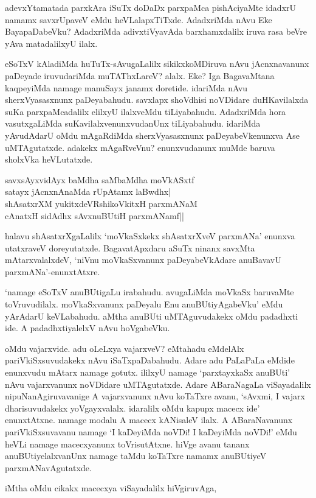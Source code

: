 adevxYtamatada parxkAra iSuTx doDaDx parxpaMca pishAciyaMte idadxrU namamx savxrUpaveV eMdu heVLalapxTiTxde. AdadxriMda nAvu Eke BayapaDabeVku? AdadxriMda adivxtiVyavAda barxhamxdalilx iruva rasa beVre yAva matadalilxyU ilalx.

eSoTxV kAladiMda huTuTx-sAvugaLalilx sikikxkoMDiruva nAvu jAcnxnavanunx paDeyade iruvudariMda muTAThxLareV? alalx. Eke? Iga BagavaMtana kaqpeyiMda namage manuSayx janamx doretide. idariMda nAvu sherxVyasasxnunx paDeyabahudu. savxlapx shoVdhisi noVDidare duHKavilalxda suKa parxpaMcadalilx elilxyU ilalxveMdu tiLiyabahudu. AdadxriMda hora vasutxgaLiMda suKavilalxvenunxvudanUnx tiLiyabahudu. idariMda yAvudAdarU oMdu mAgaRdiMda sherxVyasasxnunx paDeyabeVkenunxva Ase uMTAgutatxde. adakekx mAgaRveVnu? enunxvudanunx muMde baruva sholxVka heVLutatxde.

\begin{shloka}
savxsAyxvidAyx baMdha saMbaMdha moVkASxtf\\
satayx jAcnxnAnaMda rUpAtamx laBwdhx|\\
shAsatxrXM yukitxdeVRshikoVkitxH parxmANaM\\
cAnatxH sidAdhx sAvxnuBUtiH parxmANamf||
\end{shloka}

halavu shAsatxrXgaLalilx `moVkaSxkekx shAsatxrXveV parxmANa' enunxva utatxraveV doreyutatxde. BagavatApxdaru aSuTx ninanx savxMta mAtarxvalalxdeV, `niVnu moVkaSxvanunx paDeyabeVkAdare anuBavavU parxmANa'-enunxtAtxre.

`namage eSoTxV anuBUtigaLu irabahudu. avugaLiMda moVkaSx baruvaMte toVruvudilalx. moVkaSxvanunx paDeyalu Enu anuBUtiyAgabeVku' eMdu yArAdarU keVLabahudu. aMtha anuBUti uMTAguvudakekx oMdu padadhxti ide. A padadhxtiyalelxV nAvu hoVgabeVku.

oMdu vajarxvide. adu oLeLxya vajarxveV? eMtahadu eMdelAlx pariVkiSxsuvudakekx nAvu iSaTxpaDabahudu. Adare adu PaLaPaLa eMdide enunxvudu mAtarx namage gotutx. ililxyU namage `parxtayxkaSx anuBUti' nAvu vajarxvanunx noVDidare uMTAgutatxde. Adare ABaraNagaLa viSayadalilx nipuNanAgiruvavanige A vajarxvanunx nAvu koTaTxre avanu, `sAvxmi, I vajarx dharisuvudakekx yoVgayxvalalx. idaralilx oMdu kapupx macecx ide' enunxtAtxne. namage modalu A macecx kANisaleV ilalx. A ABaraNavanunx pariVkiSxsuvavanu namage `I kaDeyiMda noVDi! I kaDeyiMda noVDi!' eMdu heVLi namage macecxyanunx toVrisutAtxne. hiVge avanu tananx anuBUtiyelalxvanUnx namage taMdu koTaTxre namamx anuBUtiyeV parxmANavAgutatxde.

iMtha oMdu cikakx macecxya viSayadalilx hiVgiruvAga,

